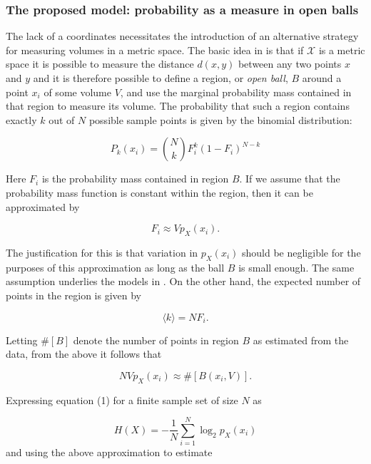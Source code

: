 \documentclass[12pt]{extarticle}
\begin{document}
\subsubsection*{The proposed model: probability as a measure in open balls}
\noindent
The lack of a coordinates necessitates the introduction of an alternative strategy for measuring volumes in a metric space. The basic idea in \cite{HC14} is that if $\mathcal{X}$ is a metric space it is possible to measure the distance $d(x,y)$ between any two points $x$ and $y$ and it is therefore possible to define a region, or \textit{open ball}, $B$ around a point $x_i$ of some volume $V$, and use the marginal probability mass contained in that region to measure its volume. The probability that such a region contains exactly $k$ out of $N$ possible sample points is given by the binomial distribution:

\begin{equation}
P_k(x_i) = \binom{N}{k}F_i^k(1-F_i)^{N-k}
\end{equation}

\noindent
Here $F_i$ is the probability mass contained in region $B$. If we assume that the probability mass function is constant within the region, then it can be approximated by

\begin{equation} 
F_i \approx Vp_X(x_i).
\end{equation}

\noindent
The justification for this is that variation in $p_X(x_i)$ should be negligible for the purposes of this approximation as long as the ball $B$ is small enough. The same assumption underlies the models in \cite{KL,KRAS}. On the other hand, the expected number of points in the region is given by 

\begin{equation}
\langle k \rangle = NF_i.
\end{equation}

\noindent
Letting $\#[B]$ denote the number of points in region $B$ as estimated from the data, from the above it follows that

\begin{equation} 
NVp_X(x_i) \approx \#[B(x_i,V)].
\end{equation}

\noindent
Expressing equation (1) for a finite sample set of size $N$ as 

\begin{equation}
H(X)=-\frac{1}{N}\sum_{i = 1}^{N} \log_2 p_X(x_i)
\end{equation}
and using the above approximation to estimate 
\end{document}
